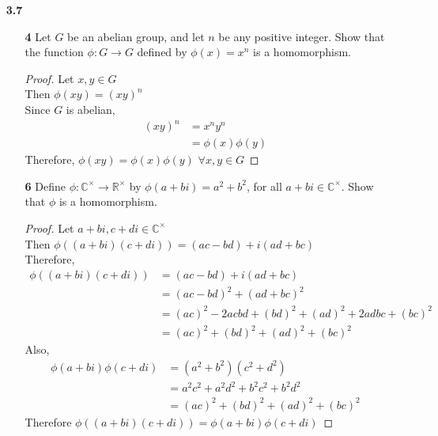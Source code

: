 \documentclass[paper=usletter, fontsize=12pt]{article}
\begin{document}

    \begin{itemize}

        \item[\textbf{3.7}]
        \begin{enumerate}

            \item[\textbf{4}] Let $G$ be an abelian group, and let $n$ be any
            positive integer. Show that the function $\phi: G \rightarrow G$
            defined by $\phi(x)=x^n$ is a homomorphism.
            \begin{proof}

                Let $x,y \in G$\\
                Then $\phi(xy)=(xy)^n$\\
                Since $G$ is abelian,
                \begin{align*}
                    (xy)^n & = x^ny^n\\
                    & = \phi(x)\phi(y)
                \end{align*}
                Therefore, $\phi(xy)=\phi(x)\phi(y)$ $\forall x,y \in G$ \qedhere

            \end{proof}

            \item[\textbf{6}] Define $\phi:
            \mathbb{C}^{\times}\rightarrow\mathbb{R}^{\times}$ by
            $\phi(a+bi)=a^2+b^2$, for all $a+bi\in \mathbb{C}^{\times}$. Show
            that $\phi$ is a homomorphism.
            \begin{proof}

                Let $a+bi,c+di \in \mathbb{C}^{\times}$\\
                Then $\phi((a+bi)(c+di))=(ac-bd)+i(ad+bc)$\\
                Therefore,
                \begin{align*}
                    \phi((a+bi)(c+di)) & = (ac-bd)+i(ad+bc)\\
                    & = (ac-bd)^2+(ad+bc)^2\\
                    & = (ac)^2-2acbd+(bd)^2+(ad)^2+2adbc+(bc)^2\\
                    & = (ac)^2+(bd)^2+(ad)^2+(bc)^2
                \end{align*}
                Also,
                \begin{align*}
                    \phi(a+bi)\phi(c+di) & = (a^2+b^2)(c^2+d^2)\\
                    & = a^2c^2+a^2d^2+b^2c^2+b^2d^2\\
                    & = (ac)^2+(bd)^2+(ad)^2+(bc)^2
                \end{align*}
                Therefore $\phi((a+bi)(c+di))=\phi(a+bi)\phi(c+di)$ \qedhere


\end{proof}
\end{enumerate}
\end{itemize}
\end{document}
